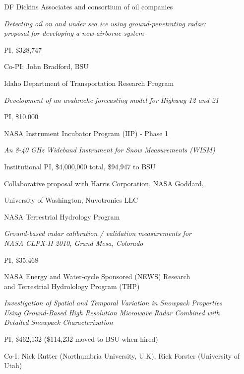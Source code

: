 \documentclass[11pt]{article}
\renewenvironment{itemize}{
  \begin{list}{}{
    \setlength{\leftmargin}{1.5em}
    \setlength{\itemsep}{0pt}
    \setlength{\parskip}{0pt}
  }
}{
  \end{list}
}
\begin{document}
\begin{itemize}
\item[01/2010-12/2012] DF Dickins Associates and consortium of oil companies
\begin{itemize}
  \item \textit{Detecting oil on and under sea ice using ground-penetrating radar: \\ 
proposal for developing a new airborne system}
  \item PI, \$328,747
  \item Co-PI: John Bradford, BSU 
\end{itemize}

\item[09/2010-08/2011] Idaho Department of Transportation Research Program
\begin{itemize}
  \item \textit{Development of an avalanche forecasting model for Highway 12 and 21}
  \item PI, \$10,000
\end{itemize}

\pagebreak

\item[11/2011-12/2014] NASA Instrument Incubator Program (IIP) - Phase 1
\begin{itemize}
\item \textit{An 8-40 GHz Wideband Instrument for Snow Measurements (WISM)}
\item Institutional PI, \$4,000,000 total,  \$94,947 to BSU
\item Collaborative proposal with Harris Corporation, NASA Goddard, 
\item University of Washington, Nuvotronics LLC
\end{itemize}

\item[08/2010-08/2012] NASA Terrestrial Hydrology Program
\begin{itemize}
\item \textit{Ground-based radar calibration / validation measurements for \\ NASA CLPX-II 2010, Grand Mesa, Colorado}
\item PI, \$35,468
\end{itemize}

\item[08/2006-07/2009] NASA Energy and Water-cycle Sponsored (NEWS) Research \\
and Terrestrial Hydrolology Program (THP)
\begin{itemize}
  \item \textit{Investigation of Spatial and Temporal Variation in Snowpack Properties \\
  Using Ground-Based High Resolution Microwave Radar Combined with \\
  Detailed Snowpack Characterization}
  \item PI, \$462,132 (\$114,232 moved to BSU when hired)
  \item Co-I: Nick Rutter (Northumbria University, U.K), Rick Forster (University of Utah)
\end{itemize}


\end{itemize}
\end{document}
